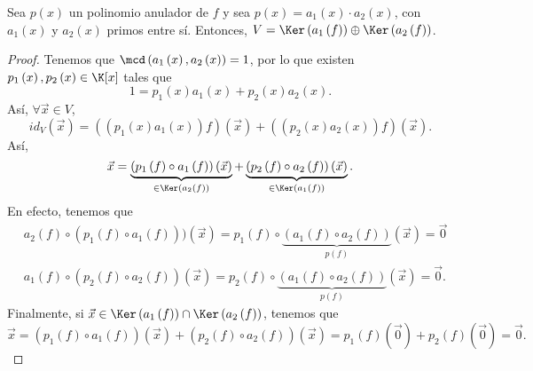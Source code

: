 \begin{ftheorem}[]
\normalfont Sea $\displaystyle p\left(x\right) $ un polinomio anulador de $\displaystyle f $ y sea $\displaystyle p\left(x\right) = a_{1}\left(x\right) \cdot a_{2}\left(x\right) $, con $\displaystyle a_{1}\left(x\right) $ y $\displaystyle a_{2}\left(x\right) $ primos entre sí. Entonces, $\displaystyle V = \Ker\left(a_{1}\left(f\right)\right) \oplus \Ker\left(a_{2}\left(f\right)\right) $.
\end{ftheorem}
\begin{proof}
	Tenemos que $\displaystyle \mcd\left(a_{1}\left(x\right), a_{2}\left(x\right)\right) = 1 $, por lo que existen $\displaystyle p_{1}\left(x\right), p_{2}\left(x\right) \in \K[x] $ tales que 
	\[ 1 = p_{1}\left(x\right)a_{1}\left(x\right) + p_{2}\left(x\right)a_{2}\left(x\right) .\]
Así, $\displaystyle \forall \vec{x} \in V $, 
\[id _{V}\left(\vec{x}\right) = \left(\left(p_{1}\left(x\right)a_{1}\left(x\right)\right)f\right)\left(\vec{x}\right) + \left(\left(p_{2}\left(x\right)a_{2}\left(x\right)\right)f\right)\left(\vec{x}\right) .\]
Así,
\[\vec{x} = \underbrace{\left(p_{1}\left(f\right)\circ a_{1}\left(f\right)\right)\left(\vec{x}\right)}_{\in\Ker\left(a_{2}\left(f\right)\right)}+\underbrace{\left(p_{2}\left(f\right)\circ a_{2}\left(f\right)\right)\left(\vec{x}\right)}_{\in\Ker\left(a_{1}\left(f\right)\right)} .\]
En efecto, tenemos que 
\[
\begin{split}
	& a_{2}\left(f\right) \circ \left(p_{1}\left(f\right)\circ a_{1}\left(f\right)\right))\left(\vec{x}\right) = p_{1}\left(f\right)\circ\underbrace{\left(a_{1}\left(f\right)\circ a_{2}\left(f\right)\right)}_{p\left(f\right)}\left(\vec{x}\right) = \vec{0} \\
	& a_{1}\left(f\right) \circ \left(p_{2}\left(f\right)\circ a_{2}\left(f\right)\right)\left(\vec{x}\right) = p_{2}\left(f\right) \circ \underbrace{\left(a_{1}\left(f\right)\circ a_{2}\left(f\right)\right)}_{p\left(f\right)}\left(\vec{x}\right) = \vec{0}.
\end{split}
\]
Finalmente, si $\displaystyle \vec{x}\in \Ker\left(a_{1}\left(f\right)\right)\cap\Ker\left(a_{2}\left(f\right)\right) $, tenemos que 
\[\vec{x} = \left(p_{1}\left(f\right) \circ a_{1}\left(f\right)\right)\left(\vec{x}\right) + \left(p_{2}\left(f\right)\circ a_{2}\left(f\right)\right)\left(\vec{x}\right) = p_{1}\left(f\right)\left(\vec{0}\right) + p_{2}\left(f\right)\left(\vec{0}\right) = \vec{0} .\]
\end{proof}

